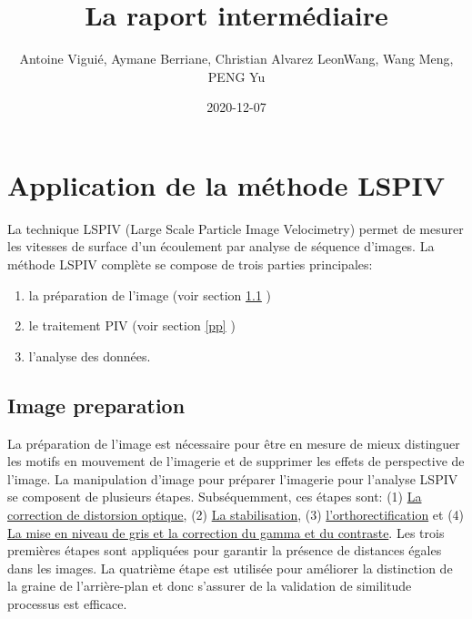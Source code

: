 \documentclass[
]{article}
\title{La raport intermédiaire}
\author{Antoine Viguié, Aymane Berriane, Christian Alvarez LeonWang, Wang Meng, PENG Yu}
\date{2020-12-07}
\begin{document}
\maketitle

{
\setcounter{tocdepth}{2}
\tableofcontents
}
\newpage

\hypertarget{application-de-la-muxe9thode-lspiv}{%
\section{Application de la méthode LSPIV}\label{application-de-la-muxe9thode-lspiv}}

La technique LSPIV (Large Scale Particle Image Velocimetry) permet de
mesurer les vitesses de surface d'un écoulement par analyse de séquence
d'images. La méthode LSPIV complète se compose de trois parties
principales:

\begin{enumerate}
\def\labelenumi{\arabic{enumi}.}
\item
  la préparation de l'image (voir section \ref{ip} )
\item
  le traitement PIV (voir section \ref{pp} )
\item
  l'analyse des données.
\end{enumerate}

\hypertarget{ip}{%
\subsection{Image preparation}\label{ip}}

La préparation de l'image est nécessaire pour être en mesure de mieux distinguer les motifs en mouvement de l'imagerie et de supprimer les effets de perspective de l'image. La manipulation d'image pour préparer l'imagerie pour l'analyse LSPIV se composent de plusieurs étapes. Subséquemment, ces étapes sont:
(1) \protect\hyperlink{la-correction-de-distorsion-optique}{La correction de distorsion optique}, (2) \protect\hyperlink{la-stabilisation}{La stabilisation}, (3) \protect\hyperlink{lorthorectification-dimage}{l'orthorectification} et
(4) \protect\hyperlink{la-mise-en-niveau-de-gris-et-la-correction-du-gamma-et-du-contraste}{La mise en niveau de gris et la correction du gamma et du contraste}. Les trois premières étapes
sont appliquées pour garantir la présence de distances égales dans les images.
La quatrième étape est utilisée pour améliorer la distinction de la graine de
l'arrière-plan et donc s'assurer de la validation de similitude
processus est efficace.
\end{document}
